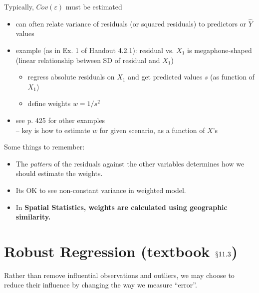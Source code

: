 \documentclass[12pt]{../notes}
\begin{document}


\begin{minipage}[l][2cm][c]{\textwidth}
\end{minipage}

Typically, $Cov(\varepsilon)$ must be estimated
\begin{itemize}
  \item can often relate variance of residuals (or squared residuals) to predictors or $\hat{Y}$ values
  \item example (as in Ex. 1 of Handout 4.2.1): residual vs. $X_1$ is megaphone-shaped\\
       (linear relationship between SD of residual and $X_1$)
        \begin{itemize}
          \item regress absolute residuals on $X_1$ and get predicted values $s$ (as function of $X_1$)
          \item define weights $w = 1/s^2$
        \end{itemize}
  \item see p. 425 for other examples\\ -- key is how to estimate $w$ for given scenario, as a function of $X$'s
\end{itemize}

\nspace
Some things to remember:
\begin{itemize}
\item The \textit{pattern} of the residuals against the other variables determines how we should estimate the weights.
\item Its OK to see non-constant variance in weighted model. 
\item In \textbf{Spatial Statistics, weights are calculated using geographic similarity.}
\end{itemize}


\section{Robust Regression (textbook $\mathsection{11.3}$)}
Rather than remove influential observations and outliers, we may choose to reduce their influence by changing the way we measure ``error''.
\end{document}

